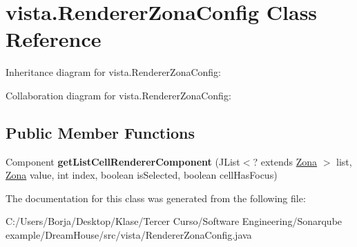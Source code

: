 \hypertarget{classvista_1_1_renderer_zona_config}{}\section{vista.\+Renderer\+Zona\+Config Class Reference}
\label{classvista_1_1_renderer_zona_config}


Inheritance diagram for vista.\+Renderer\+Zona\+Config\+:


Collaboration diagram for vista.\+Renderer\+Zona\+Config\+:
\subsection*{Public Member Functions}
\begin{DoxyCompactItemize}
\item 
\mbox{\label{classvista_1_1_renderer_zona_config_a79630527664cb2745d0f55dcf719137a}} 
Component {\bfseries get\+List\+Cell\+Renderer\+Component} (J\+List$<$? extends \mbox{\hyperlink{classmodelo_1_1_zona}{Zona}} $>$ list, \mbox{\hyperlink{classmodelo_1_1_zona}{Zona}} value, int index, boolean is\+Selected, boolean cell\+Has\+Focus)
\end{DoxyCompactItemize}


The documentation for this class was generated from the following file\+:\begin{DoxyCompactItemize}
\item 
C\+:/\+Users/\+Borja/\+Desktop/\+Klase/\+Tercer Curso/\+Software Engineering/\+Sonarqube example/\+Dream\+House/src/vista/Renderer\+Zona\+Config.\+java\end{DoxyCompactItemize}
